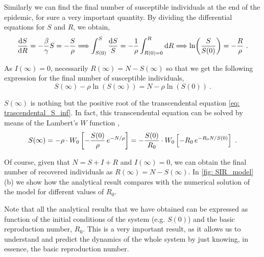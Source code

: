 Similarly we can find the final number of susceptible individuals at the end
of
the epidemic, for sure a very important quantity. By dividing the
differential
equations for $S$ and $R$, we obtain,
\begin{equation*}
  \frac{\mathrm{d} S}{\mathrm{d} R} = -\frac{\beta}{\gamma}S=-\frac{S}{\rho}
  \Longrightarrow\int_{S(0)}^S\frac{\mathrm{d}
    S}{S}=-\frac{1}{\rho}\int_{R(0)=0}^R\mathrm{d}
  R\Longrightarrow\ln(\frac{S}{S(0)})=-\frac{R}{\rho} \ .
\end{equation*}

As $I(\infty)=0$, necessarily $R(\infty)=N-S(\infty)$ so that we get the
following expression for the final number of susceptible individuals,
\begin{equation}\label{eq: trascendental_S_inf}
  S(\infty) - \rho\ln(S(\infty))=N-\rho\ln(S(0)) \ .
\end{equation}

$S(\infty)$ is nothing but the positive root of the transcendental equation
\cref{eq: trascendental_S_inf}. In fact, this transcendental equation can be
solved by means of the Lambert's $W$ function \cite{Lethonen2016},
\begin{equation}
  S(\infty)=-\rho\cdot W_0\left[-\frac{S(0)}{\rho} \,
    e^{-N/\rho}\right]=-\frac{S(0)}{R_0}\cdot W_0\left[-R_0 \, e^{-R_0N/S(0)}\right] \
  .
\end{equation}

Of course, given that $N=S+I+R$ and $I(\infty)=0$, we can obtain the final
number of recovered individuals as $R(\infty)=N-S(\infty)$. In \cref{fig:
  SIR_model}(b) we show how the analytical result compares with the numerical
solution of the model for different values of $R_0$.

\begin{remark}
  Note that all the analytical results that we have obtained can be expressed
  as function of the initial conditions of the system (e.g. $S(0)$) and the
  basic reproduction number, $R_0$. This is a very important result, as it
  allows us to understand and predict the dynamics of the whole system by just
  knowing, in essence, the basic reproduction number.
\end{remark}


